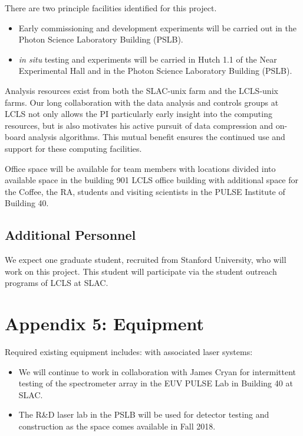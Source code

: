 There are two principle facilities identified for this project.
\begin{itemize}
\item Early commissioning and development experiments will be carried out in the Photon Science Laboratory Building (PSLB).
\item \textit{in situ} testing and experiments will be carried in Hutch 1.1 of the Near Experimental Hall and in the Photon Science Laboratory Building (PSLB).
\end{itemize}

Analysis resources exist from both the SLAC-unix farm and the LCLS-unix farms.  
Our long collaboration with the data analysis and controls groups at LCLS not only allows the PI particularly early insight into the computing resources, but is also motivates his active pursuit of data compression and on-board analysis algorithms.
This mutual benefit ensures the continued use and support for these computing facilities.

Office space will be available for team members with locations divided into available space in the building 901 LCLS office building with additional space for the Coffee, the RA, students and visiting scientists in the PULSE Institute of Building 40.

\subsection*{Additional Personnel}%

We expect one graduate student, recruited from Stanford University, who will work on this project.
This student will participate via the student outreach programs of LCLS at SLAC.

\clearpage
\appendix
\section*{Appendix 5: Equipment}

Required existing equipment includes:
\vspace{\baselineskip}
with associated laser systems: 
\begin{itemize}
\item We will continue to work in collaboration with James Cryan for intermittent testing of the spectrometer array in the EUV PULSE Lab in Building 40 at SLAC.
\item The R\&D laser lab in the PSLB will be used for detector testing and construction as the space comes available in Fall 2018.
\end{itemize}
\vspace{\baselineskip}

